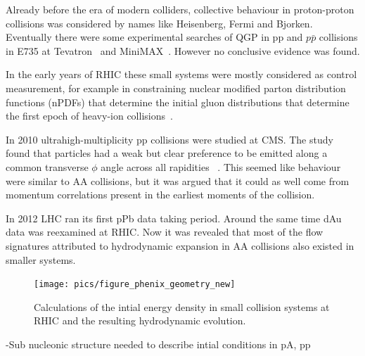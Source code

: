 Already before the era of modern colliders, collective behaviour in proton-proton collisions was considered by names like Heisenberg, Fermi and Bjorken.~\cite{Nagle:2018nvi} Eventually there were some experimental searches of QGP in pp and $p\bar p$ collisions in E735 at Tevatron~\cite{Alexopoulos:1993wt} and MiniMAX~\cite{Brooks:1999xy}. However no conclusive evidence was found. 

In the early years of RHIC these small systems were mostly considered as control measurement, for example in constraining nuclear modified parton distribution functions (nPDFs) that determine the initial gluon distributions that determine the first epoch
of heavy-ion collisions~\cite{Shen:2015qta, Adare:2015lcd}. 

In 2010 ultrahigh-multiplicity pp collisions were studied at CMS. The study found that particles had a weak but clear preference to be emitted along a common transverse $\phi$ angle across all rapidities ~\cite{Salgado:2016jws}. This seemed like behaviour were similar to AA collisions, but it was argued that it could as well come from momentum correlations present in the earliest moments of the collision.

In 2012 LHC ran its first pPb data taking period. Around the same time dAu data was reexamined at RHIC. Now it was revealed that most of the flow signatures attributed to hydrodynamic expansion in AA collisions also existed in smaller systems.
\begin{figure}[b!]
\centering
            	\texttt{[image: pics/figure\_phenix\_geometry\_new]}
                \caption{Calculations of the intial energy density in small collision systems at RHIC and the resulting hydrodynamic evolution.}
	\label{fig:smallsystems1}
\end{figure}



-Sub nucleonic structure needed to describe intial conditions in pA, pp
